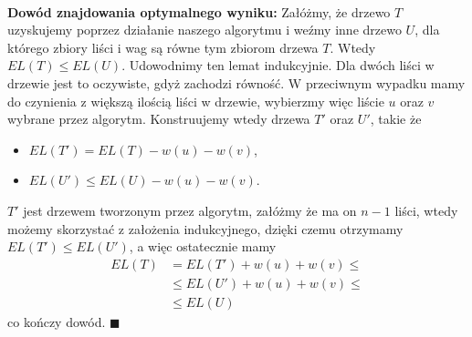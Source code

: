 \documentclass[a4paper,12pt]{article}
\begin{document}
~\\ \noindent \textbf{Dowód znajdowania optymalnego wyniku:} Załóżmy, że drzewo $T$ uzyskujemy poprzez działanie naszego algorytmu i weźmy inne drzewo $U$, dla którego zbiory liści i wag są równe tym zbiorom drzewa $T$. Wtedy $EL(T) \leq EL(U)$. Udowodnimy ten lemat indukcyjnie. Dla dwóch liści w drzewie jest to oczywiste, gdyż zachodzi równość. W przeciwnym wypadku mamy do czynienia z większą ilością liści w drzewie, wybierzmy więc liście $u$ oraz $v$ wybrane przez algorytm. Konstruujemy wtedy drzewa $T'$ oraz $U'$, takie że
\begin{itemize}
\item $EL(T') = EL(T) - w(u) - w(v)$,
\item $EL(U') \leq EL(U) - w(u) - w(v)$.
\end{itemize}
\noindent $T'$ jest drzewem tworzonym przez algorytm, załóżmy że ma on $n-1$ liści, wtedy możemy skorzystać z założenia indukcyjnego, dzięki czemu otrzymamy $EL(T') \leq EL(U')$, a więc ostatecznie mamy
$$
\begin{aligned}
EL(T) &= EL(T') + w(u) + w(v) \leq \\
         &\leq EL(U') + w(u) + w(v) \leq \\
         &\leq EL(U)
\end{aligned}
$$
co kończy dowód. $\blacksquare$
\end{document}

